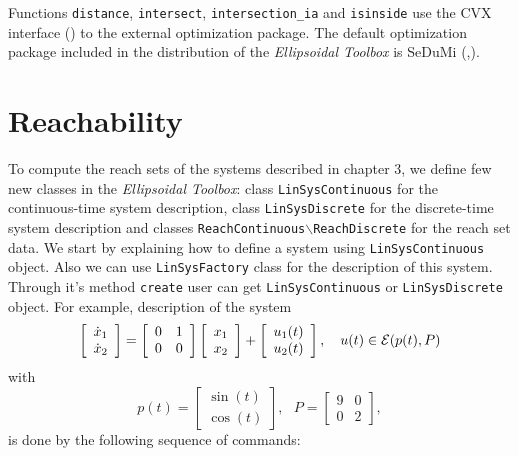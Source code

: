 Functions {\tt distance}, {\tt intersect}, {\tt intersection\_ia} and
{\tt isinside} use the CVX interface (\cite{cvxhp}) to the
external optimization package. The default optimization package included
in the distribution of the {\it Ellipsoidal Toolbox} is SeDuMi
(\cite{sedumi},\cite{sedumihp}).



\section{Reachability}
To compute the reach sets of the systems described in chapter 3, we define
few new classes in the {\it Ellipsoidal Toolbox}: class {\tt LinSysContinuous}
for the continuous-time system description, class {\tt LinSysDiscrete}
for the discrete-time system description and classes {\tt ReachContinuous$\backslash$ReachDiscrete} for the reach set data. We start by explaining how to define a system
using {\tt LinSysContinuous} object. Also we can use {\tt LinSysFactory} class for the description of this system.
Through it's method {\tt create} user can get {\tt LinSysContinuous} or {\tt LinSysDiscrete} object.
For example, description of the system
\[ \left[\begin{array}{cc}
\dot{x}_1\\
\dot{x}_2\end{array}\right] = \left[\begin{array}{cc}
0 & 1\\
0 & 0\end{array}\right]\left[\begin{array}{c}
x_1\\
x_2\end{array}\right] + \left[\begin{array}{c}
u_1(t)\\
u_2(t)\end{array}\right], ~~~ u(t)\in\EE(p(t), P) \]
with
\[ p(t) = \left[\begin{array}{c}
\sin(t)\\
\cos(t)\end{array}\right], ~~~ P = \left[\begin{array}{cc}
9 & 0\\
0 & 2\end{array}\right], \]
is done by the following sequence of commands:
